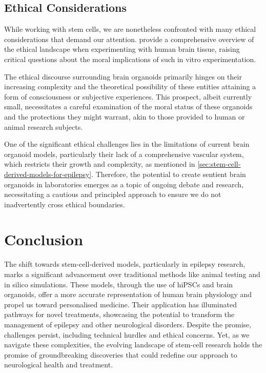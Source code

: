 \documentclass[10pt]{article}
\begin{document}
\begin{sloppypar}
  \subsection{Ethical Considerations}
  \label{sec:ethical-considerations}

  While working with stem cells, we are nonetheless confronted with many ethical considerations that demand our attention. \citeauthor{farahany_ethics_2018} \citeyearpar{farahany_ethics_2018} provide a comprehensive overview of the ethical landscape when experimenting with human brain tissue, raising critical questions about the moral implications of such in vitro experimentation.

  The ethical discourse surrounding brain organoids primarily hinges on their increasing complexity and the theoretical possibility of these entities attaining a form of consciousness or subjective experiences. This prospect, albeit currently small, necessitates a careful examination of the moral status of these organoids and the protections they might warrant, akin to those provided to human or animal research subjects.

  One of the significant ethical challenges lies in the limitations of current brain organoid models, particularly their lack of a comprehensive vascular system, which restricts their growth and complexity, as mentioned in \autoref{sec:stem-cell-derived-models-for-epilepsy}. Therefore, the potential to create sentient brain organoids in laboratories emerges as a topic of ongoing debate and research, necessitating a cautious and principled approach to ensure we do not inadvertently cross ethical boundaries.

  \section{Conclusion}
  \label{sec:conclusion}

  The shift towards stem-cell-derived models, particularly in epilepsy research, marks a significant advancement over traditional methods like animal testing and in silico simulations. These models, through the use of hiPSCs and brain organoids, offer a more accurate representation of human brain physiology and propel us toward personalised medicine. Their application has illuminated pathways for novel treatments, showcasing the potential to transform the management of epilepsy and other neurological disorders. Despite the promise, challenges persist, including technical hurdles and ethical concerns. Yet, as we navigate these complexities, the evolving landscape of stem-cell research holds the promise of groundbreaking discoveries that could redefine our approach to neurological health and treatment.


  \pagebreak
  \singlespacing
  
  

\end{sloppypar}
\end{document}
